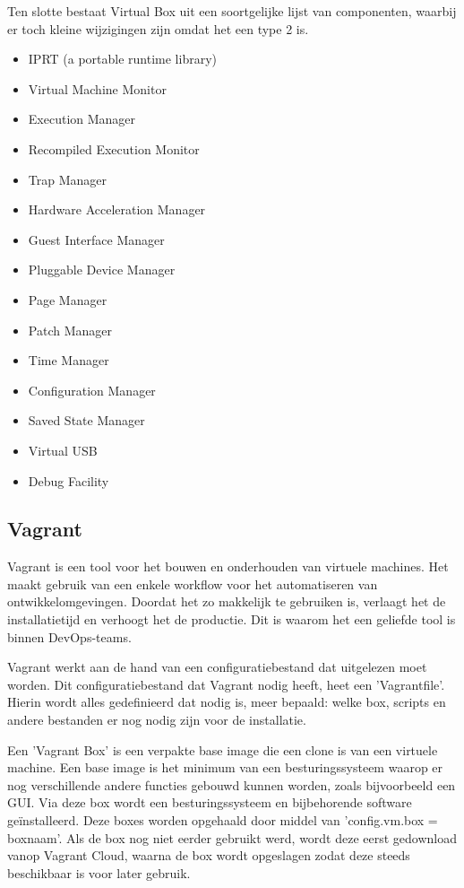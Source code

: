 Ten slotte bestaat Virtual Box uit een soortgelijke lijst van componenten, waarbij er toch kleine wijzigingen zijn omdat het een type 2 is.
\begin{itemize}[noitemsep]
	\item IPRT (a portable runtime library)
	\item Virtual Machine Monitor
	\item Execution Manager
	\item Recompiled Execution Monitor
	\item Trap Manager
	\item Hardware Acceleration Manager
	\item Guest Interface Manager
	\item Pluggable Device Manager
	\item Page Manager
	\item Patch Manager
	\item Time Manager
	\item Configuration Manager
	\item Saved State Manager
	\item Virtual USB
	\item Debug Facility
\end{itemize}

\subsection{Vagrant}
Vagrant is een tool voor het bouwen en onderhouden van virtuele machines. Het maakt gebruik van een enkele workflow voor het automatiseren van ontwikkelomgevingen. Doordat het zo makkelijk te gebruiken is, verlaagt het de installatietijd en verhoogt het de productie. Dit is waarom het een geliefde tool is binnen DevOps-teams.

Vagrant werkt aan de hand van een configuratiebestand dat uitgelezen moet worden. Dit configuratiebestand dat Vagrant nodig heeft, heet een 'Vagrantfile'. Hierin wordt alles gedefinieerd dat nodig is, meer bepaald: welke box, scripts en andere bestanden er nog nodig zijn voor de installatie.

Een 'Vagrant Box' is een verpakte base image die een clone is van een virtuele machine. Een base image is het minimum van een besturingssysteem waarop er nog verschillende andere functies gebouwd kunnen worden, zoals bijvoorbeeld een GUI. Via deze box wordt een besturingssysteem en bijbehorende software geïnstalleerd. Deze boxes worden opgehaald door middel van 'config.vm.box = boxnaam'. Als de box nog niet eerder gebruikt werd, wordt deze eerst gedownload vanop Vagrant Cloud, waarna de box wordt opgeslagen zodat deze steeds beschikbaar is voor later gebruik.

